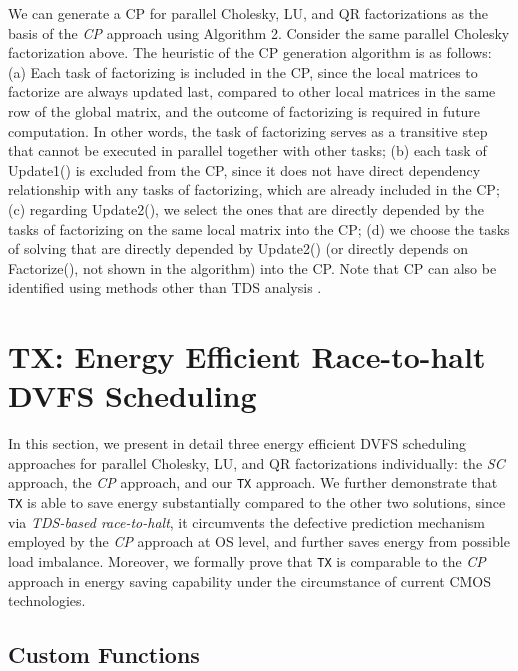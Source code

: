 \documentclass[12pt]{elsarticle}
\begin{document}
We can generate a CP for parallel Cholesky, LU, and QR factorizations as the basis of the \emph{CP} approach using Algorithm 2. Consider the same parallel Cholesky factorization above. The heuristic of the CP generation algorithm is as follows: (a) Each task of factorizing is included in the CP, since the local matrices to factorize are always updated last, compared to other local matrices in the same row of the global matrix, and the outcome of factorizing is required in future computation. In other words, the task of factorizing serves as a transitive step that cannot be executed in parallel together with other tasks; (b) each task of \textsf{Update1()} is excluded from the CP, since it does not have direct dependency relationship with any tasks of factorizing, which are already included in the CP; (c) regarding \textsf{Update2()}, we select the ones that are directly depended by the tasks of factorizing on the same local matrix into the CP; (d) we choose the tasks of solving that are directly depended by \textsf{Update2()} (or directly depends on \textsf{Factorize()}, not shown in the algorithm) into the CP. Note that CP can also be identified using methods other than TDS analysis \cite{ipdps05a} \cite{hpcs11} \cite{csrd12a}.


\section{TX: Energy Efficient Race-to-halt DVFS Scheduling}

In this section, we present in detail three energy efficient DVFS scheduling approaches for parallel Cholesky, LU, and QR factorizations individually: the \emph{SC} approach, the \emph{CP} approach, and our \texttt{TX} approach. We further demonstrate that \texttt{TX} is able to save energy substantially compared to the other two solutions, since via \emph{TDS-based race-to-halt}, it circumvents the defective prediction mechanism employed by the \emph{CP} approach at OS level, and further saves energy from possible load imbalance. Moreover, we formally prove that \texttt{TX} is comparable to the \emph{CP} approach in energy saving capability under the circumstance of current CMOS technologies.

\subsection{Custom Functions}
\end{document}

